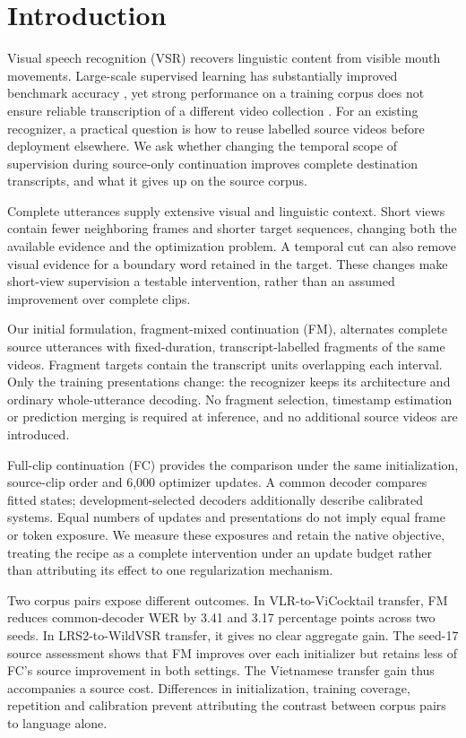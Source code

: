 \section{Introduction}
Visual speech recognition (VSR) recovers linguistic content from visible mouth
movements. Large-scale supervised learning has substantially improved benchmark
accuracy \cite{shillingford2019large,ma2023autoavsr}, yet strong performance on a
training corpus does not ensure reliable transcription of a different video
collection \cite{djilali2024wildvsr}. For an existing recognizer, a practical
question is how to reuse labelled source videos before deployment elsewhere.
We ask whether changing the temporal scope of supervision during source-only
continuation improves complete destination transcripts, and what it gives up
on the source corpus.

Complete utterances supply extensive visual and linguistic context. Short views
contain fewer neighboring frames and shorter target sequences, changing both
the available evidence and the optimization problem. A temporal cut can also
remove visual evidence for a boundary word retained in the target. These changes
make short-view supervision a testable intervention, rather than an assumed
improvement over complete clips.

Our initial formulation, fragment-mixed continuation (FM), alternates complete
source utterances with fixed-duration, transcript-labelled fragments of the same
videos. Fragment targets contain the transcript units overlapping each interval.
Only the training presentations change: the recognizer keeps its architecture
and ordinary whole-utterance decoding. No fragment selection, timestamp estimation
or prediction merging is required at inference, and no additional source videos
are introduced.

Full-clip continuation (FC) provides the comparison under the same initialization,
source-clip order and 6,000 optimizer updates. A common decoder compares fitted
states; development-selected decoders additionally describe calibrated systems.
Equal numbers of updates and presentations do not imply equal frame or token
exposure. We measure these exposures and retain the native objective, treating
the recipe as a complete intervention under an update budget rather than
attributing its effect to one regularization mechanism.

Two corpus pairs expose different outcomes. In VLR-to-ViCocktail transfer,
FM reduces common-decoder WER by 3.41 and 3.17 percentage points across two
seeds. In LRS2-to-WildVSR transfer, it gives no clear aggregate gain. The seed-17
source assessment shows that FM improves over each initializer but retains less
of FC's source improvement in both settings. The Vietnamese transfer gain thus
accompanies a source cost. Differences in initialization, training coverage,
repetition and calibration prevent attributing the contrast between corpus pairs
to language alone.

